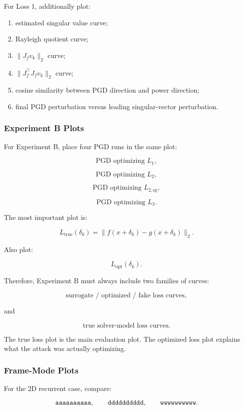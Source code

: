 \documentclass{article}
\begin{document}
For Loss 1, additionally plot:

\begin{enumerate}
    \item estimated singular value curve;
    \item Rayleigh quotient curve;
    \item \( \|J_f v_k\|_2 \) curve;
    \item \( \|J_f^\top J_f v_k\|_2 \) curve;
    \item cosine similarity between PGD direction and power direction;
    \item final PGD perturbation versus leading singular-vector perturbation.
\end{enumerate}

\subsubsection{Experiment B Plots}

For Experiment B, place four PGD runs in the same plot:

\[
\text{PGD optimizing } L_1,
\]

\[
\text{PGD optimizing } L_2,
\]

\[
\text{PGD optimizing } L_{2,\mathrm{sg}},
\]

\[
\text{PGD optimizing } L_3.
\]

The most important plot is:

\[
L_{\mathrm{true}}(\delta_k)
=
\|f(x+\delta_k)-g(x+\delta_k)\|_2.
\]

Also plot:

\[
L_{\mathrm{opt}}(\delta_k).
\]

Therefore, Experiment B must always include two families of curves:

\[
\text{surrogate / optimized / fake loss curves},
\]

and

\[
\text{true solver-model loss curves}.
\]

The true loss plot is the main evaluation plot. The optimized loss plot explains what the attack was actually optimizing.

\subsubsection{Frame-Mode Plots}

For the 2D recurrent case, compare:

\[
\texttt{aaaaaaaaaa},
\qquad
\texttt{dddddddddd},
\qquad
\texttt{wwwwwwwwww}.
\]
\end{document}
